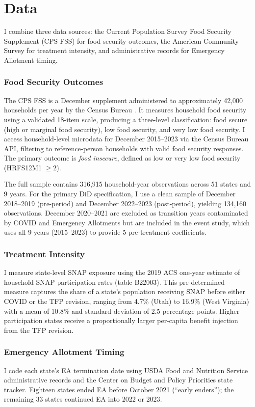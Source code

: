 \documentclass[12pt]{article}
\begin{document}
\section{Data}

I combine three data sources: the Current Population Survey Food Security Supplement (CPS FSS) for food security outcomes, the American Community Survey for treatment intensity, and administrative records for Emergency Allotment timing.

\subsubsection*{Food Security Outcomes} The CPS FSS is a December supplement administered to approximately 42,000 households per year by the Census Bureau \citep{coleman2024}. It measures household food security using a validated 18-item scale, producing a three-level classification: food secure (high or marginal food security), low food security, and very low food security. I access household-level microdata for December 2015--2023 via the Census Bureau API, filtering to reference-person households with valid food security responses. The primary outcome is \emph{food insecure}, defined as low or very low food security (HRFS12M1 $\geq 2$).

The full sample contains 316,915 household-year observations across 51 states and 9 years. For the primary DiD specification, I use a clean sample of December 2018--2019 (pre-period) and December 2022--2023 (post-period), yielding 134,160 observations. December 2020--2021 are excluded as transition years contaminated by COVID and Emergency Allotments but are included in the event study, which uses all 9 years (2015--2023) to provide 5 pre-treatment coefficients.

\subsubsection*{Treatment Intensity} I measure state-level SNAP exposure using the 2019 ACS one-year estimate of household SNAP participation rates (table B22003). This pre-determined measure captures the share of a state's population receiving SNAP before either COVID or the TFP revision, ranging from 4.7\% (Utah) to 16.9\% (West Virginia) with a mean of 10.8\% and standard deviation of 2.5 percentage points. Higher-participation states receive a proportionally larger per-capita benefit injection from the TFP revision.

\subsubsection*{Emergency Allotment Timing} I code each state's EA termination date using USDA Food and Nutrition Service administrative records and the Center on Budget and Policy Priorities state tracker. Eighteen states ended EA before October 2021 (``early enders''); the remaining 33 states continued EA into 2022 or 2023.
\end{document}
